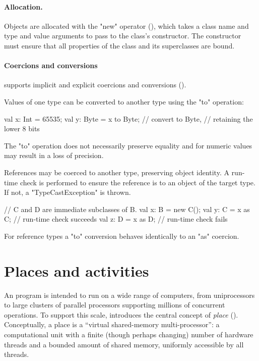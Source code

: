 \paragraph{Allocation.}
Objects are allocated with the \xcd"new" operator
(), which takes
a class name and type and value arguments to pass to the class's
constructor.  The constructor must ensure that all properties of
the class and its superclasses are bound.

\paragraph{Coercions and conversions}
\Xten{} supports implicit and explicit coercions and
conversions ().

Values of one type can be converted to another type using the
\xcd"to" operation:
\begin{xten}
val x: Int = 65535;
val y: Byte = x to Byte; // convert to Byte,
                         // retaining the lower 8 bits
\end{xten}
The \xcd"to" operation does not necessarily preserve equality
and for numeric values may 
result in a loss of precision.

References may be coerced to another type, preserving object
identity.  A run-time check is performed to ensure the reference
is to an object of the target type.  If not,
a \xcd"TypeCastException" is thrown.
\begin{xten}
// C and D are immediate subclasses of B.
val x: B = new C();
val y: C = x as C; // run-time check succeeds
val z: D = x as D; // run-time check fails
\end{xten}
For reference types a \xcd"to" conversion behaves identically to
an \xcd"as" coercion.

\section{Places and activities}
An \Xten{} program is intended to run on a wide range of computers,
from uniprocessors to large clusters of parallel processors supporting
millions of concurrent operations. To support this scale, \Xten{}
introduces the central concept of \emph{place} ().
Conceptually, a place is a ``virtual shared-memory multi-processor'':
a computational unit with a finite (though perhaps changing) number of
hardware threads and a bounded amount of shared memory, uniformly
accessible by all threads.

